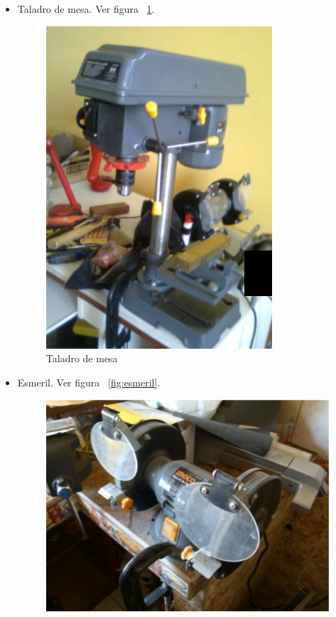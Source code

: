 \begin{itemize}
  \item Taladro de mesa. Ver figura ~\ref{fig:taladro-mesa}.
    \begin{figure}[h!]
      \centering
      \includegraphics[scale=0.5]{images/company/taladro-mesa.png}
      \caption{Taladro de mesa}
      \label{fig:taladro-mesa}
    \end{figure}
  \item Esmeril. Ver figura ~\ref{fig:esmeril}.
    \begin{figure}[h!]
      \centering
      \includegraphics[scale=0.5]{images/company/esmeril.png}

\end{figure}
\end{itemize}
